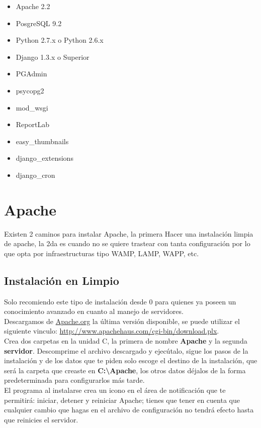 \begin{itemize}
    \item Apache 2.2
    \item PosgreSQL 9.2
    \item Python 2.7.x o Python 2.6.x
    \item Django 1.3.x o Superior
    \item PGAdmin
    \item psycopg2
    \item mod\_wsgi
    \item ReportLab
    \item easy\_thumbnails
    \item django\_extensions
    \item django\_cron
\end{itemize}


\section{Apache}

Existen 2 caminos para instalar Apache, la primera Hacer una instalación limpia de apache, la 2da es cuando no se quiere trastear con tanta configuración por lo que opta por infraestructuras tipo WAMP, LAMP, WAPP, etc. 

\subsection{Instalación en Limpio}

Solo recomiendo este tipo de instalación desde 0 para quienes ya poseen un conocimiento avanzado en cuanto al manejo de servidores. \\[0.5cm]

Descargamos de \url{Apache.org} la última versión disponible, se puede utilizar el siguiente vinculo: \url{http://www.apachehaus.com/cgi-bin/download.plx}.\\[0.5cm]

Crea dos carpetas en la unidad C, la primera de nombre {\bfseries Apache} y la segunda {\bfseries servidor}. Descomprime el archivo descargado y ejecútalo, sigue los pasos de la instalación y de los datos que te piden solo escoge el destino de la instalación, que será la carpeta que creaste en {\bfseries C:\textbackslash Apache}, los otros datos déjalos de la forma predeterminada para configurarlos más tarde. \\[0.5cm]

El programa al instalarse crea un icono en el área de notificación que te permitirá: iniciar, detener y reiniciar Apache; tienes que tener en cuenta que cualquier cambio que hagas en el archivo de configuración no tendrá efecto hasta que reinicies el servidor. \\[0.5cm]

